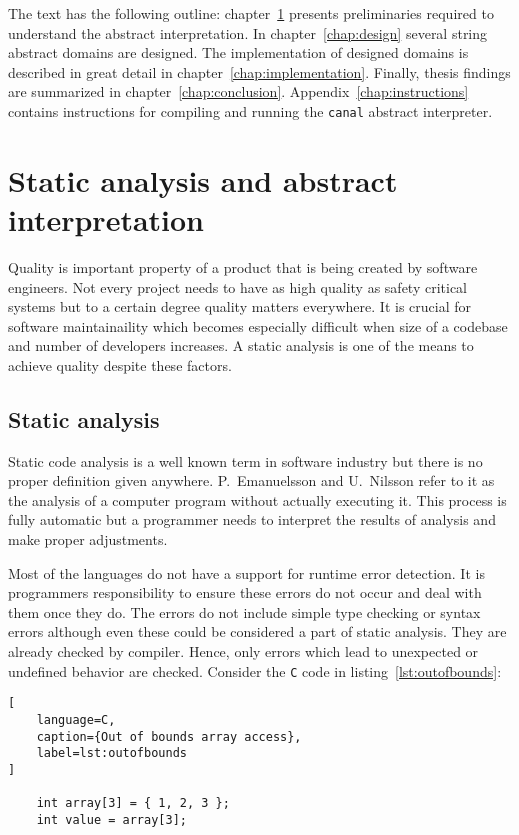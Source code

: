 \documentclass[12pt,final,oneside]{fithesis2}
\begin{document}
The text has the following outline: chapter~\ref{chap:preliminaries}
presents preliminaries required to understand the abstract interpretation.
In chapter~\ref{chap:design} several string abstract domains are designed.
The implementation of designed domains is described in great detail in
chapter~\ref{chap:implementation}. Finally, thesis findings are summarized
in chapter~\ref{chap:conclusion}. Appendix~\ref{chap:instructions} contains
instructions for compiling and running the \texttt{canal} abstract
interpreter.


\chapter{Static analysis and abstract interpretation}
\label{chap:preliminaries}

Quality is important property of a product that is being created by
software engineers. Not every project needs to have as high quality as
safety critical systems but to a certain degree quality matters
everywhere. It is crucial for software maintainaility which becomes
especially difficult when size of a codebase and number of developers
increases. A static analysis is one of the means to achieve quality
despite these factors.


\section{Static analysis}

Static code analysis is a well known term in software industry but there
is no proper definition given anywhere. P.~Emanuelsson and U.~Nilsson
\cite{EmanuelssonNilsson08-1} refer to it as the analysis of a computer
program without actually executing it. This process is fully automatic
but a programmer needs to interpret the results of analysis and make
proper adjustments.

Most of the languages do not have a support for runtime error detection.
It is programmers responsibility to ensure these errors do not occur
and deal with them once they do. The errors do not include simple type
checking or syntax errors although even these could be considered a part
of static analysis. They are already checked by compiler. Hence, only
errors which lead to unexpected or undefined behavior are checked.
Consider the \texttt{C} code in listing~\ref{lst:outofbounds}:

\begin{lstlisting}[
    language=C,
    caption={Out of bounds array access},
    label=lst:outofbounds
]

    int array[3] = { 1, 2, 3 };
    int value = array[3];

\end{lstlisting}
\end{document}
